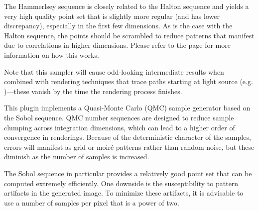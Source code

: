 The Hammerlsey sequence is closely related to the Halton sequence and yields a very
high quality point set that is slightly more regular (and has lower discrepancy),
especially in the first few dimensions. As is the case with the Halton sequence,
the points should be scrambled to reduce patterns that manifest due to correlations
in higher dimensions. Please refer to the  page for more information
on how this works.

Note that this sampler will cause odd-looking intermediate results when combined with rendering
techniques that trace paths starting at light source (e.g. )---these vanish
by the time the rendering process finishes.



This plugin implements a Quasi-Monte Carlo (QMC) sample generator based on the
Sobol sequence. QMC number sequences are designed to reduce sample clumping
across integration dimensions, which can lead to a higher order of
convergence in renderings. Because of the deterministic character of the samples,
errors will manifest as grid or moir\'e patterns rather than random noise, but
these diminish as the number of samples is increased.

The Sobol sequence in particular provides a relatively good point set that can
be computed extremely efficiently. One downside is the susceptibility to pattern artifacts
in the generated image. To minimize these artifacts, it is advisable to use
a number of samples per pixel that is a power of two.

